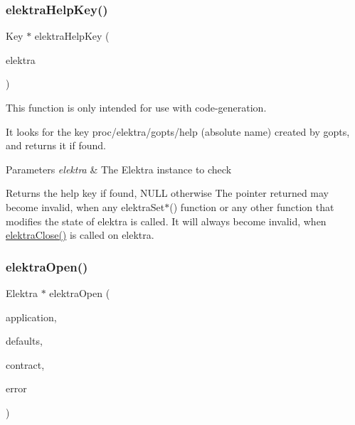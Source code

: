 \subsubsection{\texorpdfstring{elektraHelpKey()}{elektraHelpKey()}}
{\footnotesize\ttfamily Key $\ast$ elektra\+Help\+Key (\begin{DoxyParamCaption}\item[{Elektra $\ast$}]{elektra }\end{DoxyParamCaption})}



This function is only intended for use with code-\/generation. 

It looks for the key proc/elektra/gopts/help (absolute name) created by gopts, and returns it if found.


\begin{DoxyParams}{Parameters}
{\em elektra} & The Elektra instance to check\\
\hline
\end{DoxyParams}
\begin{DoxyReturn}{Returns}
the help key if found, N\+U\+LL otherwise The pointer returned may become invalid, when any {\ttfamily elektra\+Set$\ast$()} function or any other function that modifies the state of {\ttfamily elektra} is called. It will always become invalid, when \mbox{\hyperlink{group__highlevel_ga9b688b7250e5f9d8ea6701cc2cc269af}{elektra\+Close()}} is called on {\ttfamily elektra}. 
\end{DoxyReturn}
\mbox{\label{group__highlevel_ga45de58b05c7a8ab02f6c54ddd31a56e1}} 
\subsubsection{\texorpdfstring{elektraOpen()}{elektraOpen()}}
{\footnotesize\ttfamily Elektra $\ast$ elektra\+Open (\begin{DoxyParamCaption}\item[{const char $\ast$}]{application,  }\item[{Key\+Set $\ast$}]{defaults,  }\item[{Key\+Set $\ast$}]{contract,  }\item[{Elektra\+Error $\ast$$\ast$}]{error }\end{DoxyParamCaption})}



